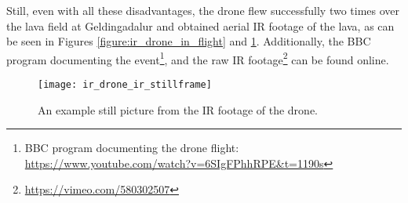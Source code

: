 Still, even with all these disadvantages, the drone flew successfully two times
over the lava field at Geldingadalur and obtained aerial IR footage of the lava,
as can be seen in Figures \ref{figure:ir_drone_in_flight} and \ref{figure:ir_drone_ir_still}.
Additionally, the BBC program documenting the event\footnote{BBC program documenting the drone flight: \url{https://www.youtube.com/watch?v=6SIgFPhhRPE&t=1190s}}, and the raw IR footage\footnote{\url{https://vimeo.com/580302507}} can be found online.

\begin{figure}
    \centering
    \texttt{[image: ir\_drone\_ir\_stillframe]}
    \caption{An example still picture from the IR footage of the drone.}
    \label{figure:ir_drone_ir_still}
\end{figure}